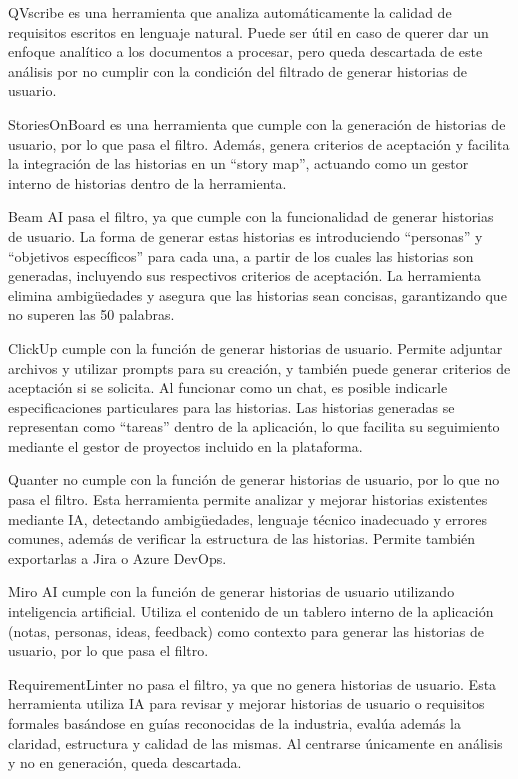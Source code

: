QVscribe \cite{qvscribe} es una herramienta que analiza automáticamente la calidad de requisitos escritos en lenguaje natural. Puede ser útil en caso de querer dar un enfoque analítico a los documentos a procesar, pero queda descartada de este análisis por no cumplir con la condición del filtrado de generar historias de usuario.

StoriesOnBoard \cite{storiesonboard} es una herramienta que cumple con la generación de historias de usuario, por lo que pasa el filtro. Además, genera criterios de aceptación y facilita la integración de las historias en un “story map”, actuando como un gestor interno de historias dentro de la herramienta.

Beam AI \cite{beamai} pasa el filtro, ya que cumple con la funcionalidad de generar historias de usuario. La forma de generar estas historias es introduciendo “personas” y “objetivos específicos” para cada una, a partir de los cuales las historias son generadas, incluyendo sus respectivos criterios de aceptación. La herramienta elimina ambigüedades y asegura que las historias sean concisas, garantizando que no superen las 50 palabras.

ClickUp \cite{clickup} cumple con la función de generar historias de usuario. Permite adjuntar archivos y utilizar prompts para su creación, y también puede generar criterios de aceptación si se solicita. Al funcionar como un chat, es posible indicarle especificaciones particulares para las historias. Las historias generadas se representan como “tareas” dentro de la aplicación, lo que facilita su seguimiento mediante el gestor de proyectos incluido en la plataforma.

Quanter \cite{quanter} no cumple con la función de generar historias de usuario, por lo que no pasa el filtro. Esta herramienta permite analizar y mejorar historias existentes mediante IA, detectando ambigüedades, lenguaje técnico inadecuado y errores comunes, además de verificar la estructura de las historias. Permite también exportarlas a Jira o Azure DevOps.

Miro AI \cite{miroai} cumple con la función de generar historias de usuario utilizando inteligencia artificial. Utiliza el contenido de un tablero interno de la aplicación (notas, personas, ideas, feedback) como contexto para generar las historias de usuario, por lo que pasa el filtro.

RequirementLinter \cite{requirementlinter} no pasa el filtro, ya que no genera historias de usuario. Esta herramienta utiliza IA para revisar y mejorar historias de usuario o requisitos formales basándose en guías reconocidas de la industria, evalúa además la claridad, estructura y calidad de las mismas. Al centrarse únicamente en análisis y no en generación, queda descartada.

